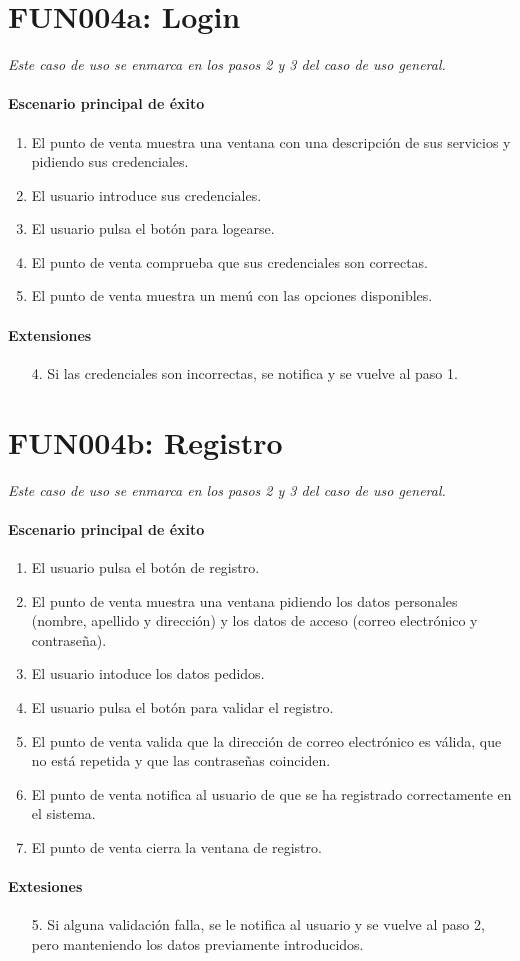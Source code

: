 \section{FUN004a: Login}
  \emph{Este caso de uso se enmarca en los pasos 2 y 3 del caso de uso general.}
  \paragraph{Escenario principal de éxito}
  \begin{enumerate}
    \item El punto de venta muestra una ventana con una descripción de sus servicios y pidiendo sus credenciales.
    \item El usuario introduce sus credenciales.
    \item El usuario pulsa el botón para logearse.
    \item El punto de venta comprueba que sus credenciales son correctas.
    \item El punto de venta muestra un menú con las opciones disponibles.
  \end{enumerate}
  \paragraph{Extensiones}
  \begin{enumerate}
    \item[4.] Si las credenciales son incorrectas, se notifica y se vuelve al paso 1.
  \end{enumerate}

\section{FUN004b: Registro}
  \emph{Este caso de uso se enmarca en los pasos 2 y 3 del caso de uso general.}
  \paragraph{Escenario principal de éxito}
  \begin{enumerate}
    \item El usuario pulsa el botón de registro.
    \item El punto de venta muestra una ventana pidiendo los datos personales (nombre, apellido y dirección) y los datos de acceso (correo electrónico y contraseña).
    \item El usuario intoduce los datos pedidos.
    \item El usuario pulsa el botón para validar el registro.
    \item El punto de venta valida que la dirección de correo electrónico es válida, que no está repetida y que las contraseñas coinciden.
    \item El punto de venta notifica al usuario de que se ha registrado correctamente en el sistema.
    \item El punto de venta cierra la ventana de registro.
  \end{enumerate}
  \paragraph{Extesiones}
  \begin{enumerate}
     \item[5.] Si alguna validación falla, se le notifica al usuario y se vuelve al paso 2, pero manteniendo los datos previamente introducidos.
  \end{enumerate}